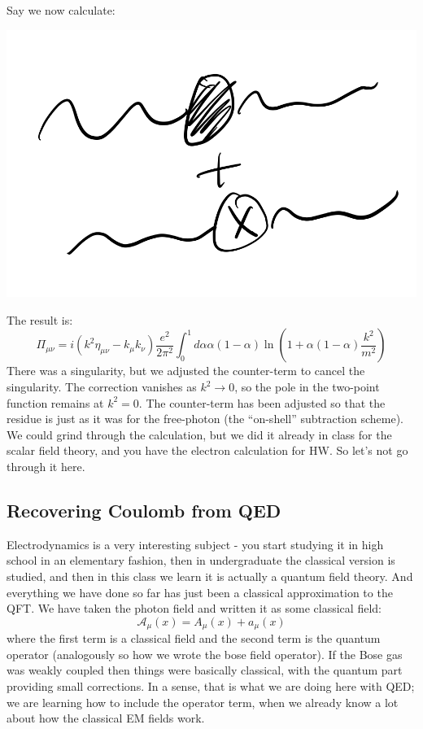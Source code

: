Say we now calculate:

\begin{center}
    \includegraphics[scale=0.5]{Images/lec32p2.png}
\end{center}

The result is:
\begin{equation}
    \Pi_{\mu\nu} = i(k^2\eta_{\mu\nu} - k_\mu k_\nu) \frac{e^2}{2\pi^2}\int_0^1 d\alpha \alpha(1-\alpha)\ln(1 + \alpha(1-\alpha)\frac{k^2}{m^2})
\end{equation}
There was a singularity, but we adjusted the counter-term to cancel the singularity. The correction vanishes as $k^2 \to 0$, so the pole in the two-point function remains at $k^2 = 0$. The counter-term has been adjusted so that the residue is just as it was for the free-photon (the ``on-shell'' subtraction scheme). We could grind through the calculation, but we did it already in class for the scalar field theory, and you have the electron calculation for HW. So let's not go through it here.

\subsection{Recovering Coulomb from QED}
Electrodynamics is a very interesting subject - you start studying it in high school in an elementary fashion, then in undergraduate the classical version is studied, and then in this class we learn it is actually a quantum field theory. And everything we have done so far has just been a classical approximation to the QFT. We have taken the photon field and written it as some classical field:
\begin{equation}
    \mathcal{A}_\mu(x) = A_\mu(x) + a_\mu(x)
\end{equation}
where the first term is a classical field and the second term is the quantum operator (analogously so how we wrote the bose field operator). If the Bose gas was weakly coupled then things were basically classical, with the quantum part providing small corrections. In a sense, that is what we are doing here with QED; we are learning how to include the operator term, when we already know a lot about how the classical EM fields work.

